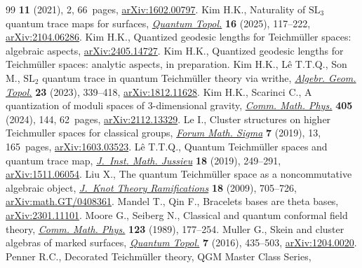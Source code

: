\documentclass[pdftex]{sigma}
\numberwithin{equation}{section}
\theoremstyle{definition}
\begin{document}
\begin{thebibliography}{99}
 \textbf{11} (2021), 2, 66~pages,
 \href{http://arxiv.org/abs/1602.00797}{arXiv:1602.00797}.
Kim H.K., Naturality of {$\mathrm{SL}_3$} quantum trace maps for surfaces,
 \href{https://doi.org/10.4171/qt/214}{\textit{Quantum Topol.}} \textbf{16}
 (2025), 117--222, \href{http://arxiv.org/abs/2104.06286}{arXiv:2104.06286}.
Kim H.K., Quantized geodesic lengths for {T}eichm\"{u}ller spaces: algebraic
 aspects, \href{http://arxiv.org/abs/2405.14727}{arXiv:2405.14727}.
Kim H.K., Quantized geodesic lengths for {T}eichm\"uller spaces: analytic
 aspects, {i}n preparation.
Kim H.K., L\^{e} T.T.Q., Son M., {$\mathrm{SL}_2$} quantum trace in quantum
 {T}eichm\"{u}ller theory via writhe,
 \href{https://doi.org/10.2140/agt.2023.23.339}{\textit{Algebr. Geom. Topol.}}
 \textbf{23} (2023), 339--418,
 \href{http://arxiv.org/abs/1812.11628}{arXiv:1812.11628}.
Kim H.K., Scarinci C., A quantization of moduli spaces of $3$-dimensional
 gravity, \href{https://doi.org/10.1007/s00220-024-05012-8}{\textit{Comm.
 Math. Phys.}} \textbf{405} (2024), 144, 62~pages,
 \href{http://arxiv.org/abs/2112.13329}{arXiv:2112.13329}.
Le I., Cluster structures on higher {T}eichmuller spaces for classical groups,
 \href{https://doi.org/10.1017/fms.2019.5}{\textit{Forum Math. Sigma}}
 \textbf{7} (2019), 13, 165~pages,
 \href{http://arxiv.org/abs/1603.03523}{arXiv:1603.03523}.
L\^{e} T.T.Q., Quantum {T}eichm\"{u}ller spaces and quantum trace map,
 \href{https://doi.org/10.1017/s1474748017000068}{\textit{J.~Inst. Math.
 Jussieu}} \textbf{18} (2019), 249--291,
 \href{http://arxiv.org/abs/1511.06054}{arXiv:1511.06054}.
Liu X., The quantum {T}eichm\"{u}ller space as a noncommutative algebraic
 object, \href{https://doi.org/10.1142/S0218216509007129}{\textit{J.~Knot
 Theory Ramifications}} \textbf{18} (2009), 705--726,
 \href{http://arxiv.org/abs/math.GT/0408361}{arXiv:math.GT/0408361}.
Mandel T., Qin F., Bracelets bases are theta bases,
 \href{http://arxiv.org/abs/2301.11101}{arXiv:2301.11101}.
Moore G., Seiberg N., Classical and quantum conformal field theory,
 \href{https://doi.org/10.1007/BF01238857}{\textit{Comm. Math. Phys.}}
 \textbf{123} (1989), 177--254.
Muller G., Skein and cluster algebras of marked surfaces,
 \href{https://doi.org/10.4171/QT/79}{\textit{Quantum Topol.}} \textbf{7}
 (2016), 435--503, \href{http://arxiv.org/abs/1204.0020}{arXiv:1204.0020}.
Penner R.C., Decorated {T}eichm\"{u}ller theory, QGM Master Class Series,

\end{thebibliography}
\end{document}
